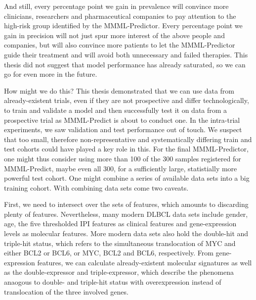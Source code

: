And still, every percentage point we gain in prevalence will convince more clinicians, researchers 
and pharmaceutical companies to pay attention to the high-risk group identified by the MMML-Predictor.
Every percentage point we gain in precision will not just spur more interest of the above people and 
companies, but will also convince more patients to let the MMML-Predictor guide their treatment and 
will avoid both unnecessary and failed therapies. This thesis did not suggest that model performance 
has already saturated, so we can go for even more in the future.

How might we do this? This thesis demonstrated that we can use data from already-existent trials, 
even if they are not prospective and differ technologically, to train and validate a model and 
then successfully test it on data from a prospective trial as MMML-Predict is about to conduct one.
In the intra-trial experiments, we saw validation and test performance out of touch. We suspect 
that too small, therefore non-representative and systematically differing train and test cohorts 
could have played a key role in this. For the final MMML-Predictor, one might thus consider 
using more than \num{100} of the \num{300} samples registered for MMML-Predict, maybe even all 
\num{300}, for a sufficiently large, statistially more powerful test cohort. One might combine 
a series of available data sets into a big training cohort. With combining data sets come two 
caveats. 

First, we need to intersect over the sets of features, which amounts to discarding plenty 
of features. Nevertheless, many modern DLBCL data sets include gender, age, the five thresholded 
IPI features as clinical features and gene-expression levels as molecular features. More modern data 
sets also hold the double-hit and triple-hit status, which refers to the simultaneous translocation 
of MYC and either BCL2 or BCL6, or MYC, BCL2 and BCL6, respectively. From gene-expression 
features, we can calculate already-existent molecular signatures as well as the double-expressor and 
triple-expressor, which describe the phenomena anaogous to double- and triple-hit status with 
overexpression instead of translocation of the three involved genes.

